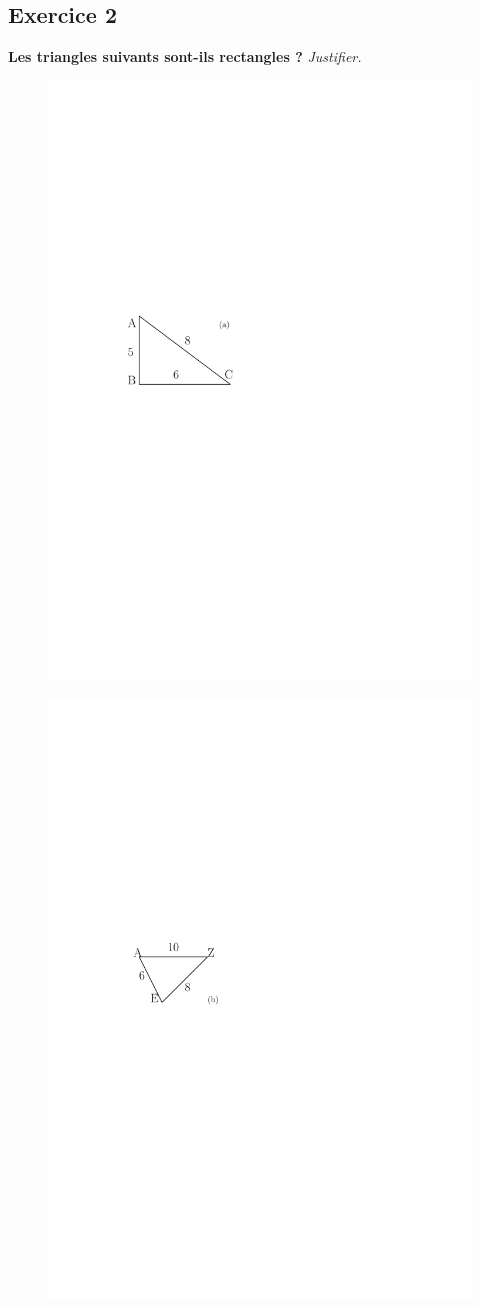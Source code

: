 \documentclass[12pt]{article}
\begin{document}
\begin{multicols}{3}

  \subsection*{Exercice 2}
  \textbf{Les triangles suivants sont-ils rectangles ?} \textit{Justifier.}
  
  \begin{figure}[H]
    \centering
    \includegraphics[width=0.7\linewidth]{sources/1/exo2-tri-1a.pdf}
  \end{figure}

  \begin{figure}[H]
    \centering
    \includegraphics[width=0.7\linewidth]{sources/1/exo2-tri-2.pdf}
  \end{figure}

\end{multicols}
\end{document}
